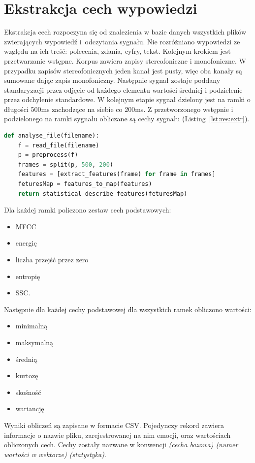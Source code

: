 \documentclass[a4paper,12pt,twoside,openany]{report}
\newcommand{\Lst}[1]{(Listing~\ref{#1})}
\begin{document}
\section{Ekstrakcja cech wypowiedzi}
Ekstrakcja cech rozpoczyna się od znalezienia w bazie danych wszystkich plików zwierających wypowiedź i~odczytania sygnału. 
Nie rozróżniano wypowiedzi ze względu na ich treść: polecenia, zdania, cyfry, tekst.
Kolejnym krokiem jest przetwarzanie wstępne. 
Korpus zawiera zapisy stereofoniczne i monofoniczne. 
W przypadku zapisów stereofonicznych jeden kanał jest pusty, więc oba kanały są sumowane dając zapis monofoniczny.
Następnie sygnał zostaje poddany standaryzacji przez odjęcie od każdego elementu wartości średniej i podzielenie przez odchylenie standardowe.
W kolejnym etapie sygnał dzielony jest na ramki o długości 500ms zachodzące na siebie co 200ms.
Z przetworzonego wstępnie i podzielonego na ramki sygnału obliczane są cechy sygnału \Lst{lst:res:extr}.
\begin{lstlisting}[language=Python,label={lst:res:extr},caption={funkcja obliczająca cechy sygnału pojedynczego pliku}]
def analyse_file(filename):
    f = read_file(filename)
    p = preprocess(f)
    frames = split(p, 500, 200)
    features = [extract_features(frame) for frame in frames]
    feturesMap = features_to_map(features)
    return statistical_describe_features(feturesMap)
\end{lstlisting}
Dla każdej ramki policzono zestaw cech podstawowych: 
\begin{itemize}
	\item MFCC
	\item energię
	\item liczba przejść przez zero
	\item entropię
	\item SSC.
\end{itemize}
Następnie dla każdej cechy podstawowej dla wszystkich ramek obliczono wartości:
\begin{itemize}
	\item minimalną
	\item maksymalną
	\item średnią
	\item kurtozę
	\item skośność
	\item wariancję
\end{itemize}
Wyniki obliczeń są zapisane w formacie CSV.
Pojedynczy rekord zawiera informacje o nazwie pliku, zarejestrowanej na nim emocji, 
oraz wartościach obliczonych cech.
Cechy zostały nazwane w konwencji \textit{(cecha bazowa) (numer wartości w wektorze) (statystyka)}.
\end{document}

